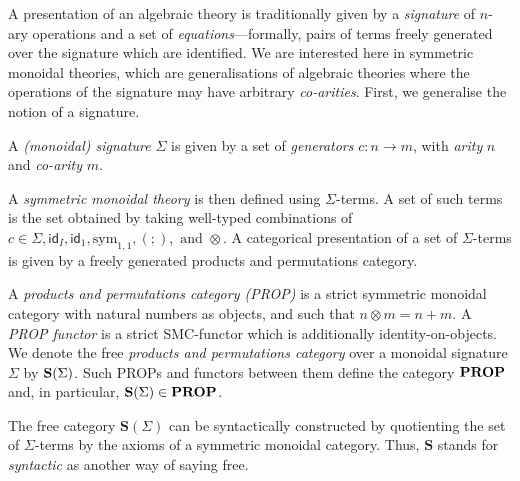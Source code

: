 A presentation of an algebraic theory is traditionally given by a \textit{signature} of $n$-ary operations and a set of \textit{equations}---formally,  pairs of terms freely generated over the signature which are identified.  We are interested here in symmetric monoidal theories, which are generalisations of algebraic theories where the operations of the signature may have arbitrary \textit{co-arities}.  
First,  we generalise the notion of a signature. 
\begin{definition}
A \textit{(monoidal) signature} $\Sigma$ is given by a set of \textit{generators} $c: n \to m$,  with \textit{arity} $n$ and \textit{co-arity} $m$.  %
\end{definition}


A \textit{symmetric monoidal theory} is then defined using $\Sigma$-terms.
A set of such terms is the set obtained by taking well-typed combinations of $c \in \Sigma, \textsf{id}_{I}, \textsf{id}_{1}, \text{sym}_{1,1}, (;), \text{ and } \otimes$.
A categorical presentation of a set of $\Sigma$-terms is given by a freely generated products and permutations category.

\begin{definition}
A \textit{products and permutations category (PROP)} is a strict symmetric monoidal category with natural numbers as objects,  and such that $n \otimes m = n+m$.  
A \textit{PROP functor} is a strict SMC-functor which is additionally identity-on-objects.
We denote the free \textit{products and permutations category} over a monoidal signature $\Sigma$ by $\mathbf{S}(\Sigma)$.
Such PROPs and functors between them define the category $\mathbf{PROP}$ and, in particular, $\mathbf{S}(\Sigma) \in \mathbf{PROP}$.
\end{definition}
The free category $\textbf{S}(\Sigma)$ can be syntactically constructed by quotienting the set of $\Sigma$-terms by the axioms of a symmetric monoidal category.
Thus, $\textbf{S}$ stands for \textit{syntactic} as another way of saying free.

